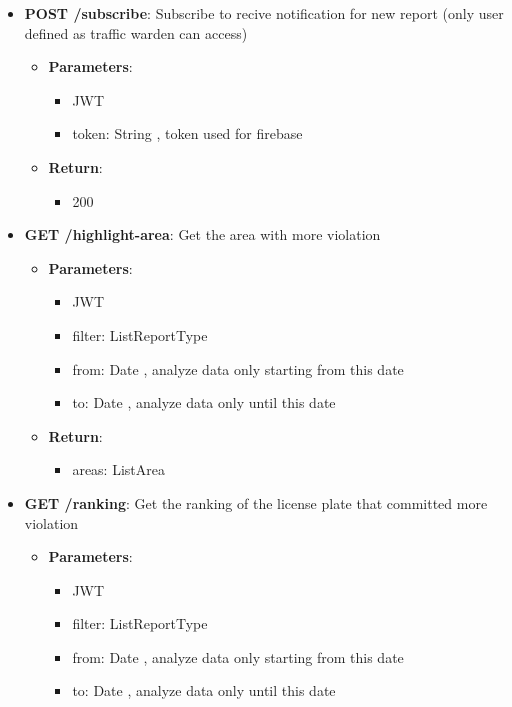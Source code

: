 \documentclass{article}
\begin{document}
\begin{itemize}
\begin{itemize}
			\item \textbf{POST /subscribe}:
				Subscribe to recive notification for new report (only user defined as traffic warden can access)
				\begin{itemize}
					\item \textbf{Parameters}:
						\begin{itemize}
							\item JWT
							\item token: String , token used for firebase
						\end{itemize}
					\item \textbf{Return}:
						\begin{itemize}
							\item 200
						\end{itemize}
				\end{itemize}
			\item \textbf{GET /highlight-area}:
				Get the area with more violation
				\begin{itemize}
					\item \textbf{Parameters}:
						\begin{itemize}
							\item JWT
							\item filter: List\textlangle{}ReportType\textrangle{}
							\item from: Date , analyze data only starting from this date
							\item to: Date , analyze data only until this date
						\end{itemize}
					\item \textbf{Return}:
						\begin{itemize}
							\item areas: List\textlangle{}Area\textrangle{}
						\end{itemize}
				\end{itemize}
			\item \textbf{GET /ranking}:
				Get the ranking of the license plate that committed more violation
				\begin{itemize}
					\item \textbf{Parameters}:
						\begin{itemize}
							\item JWT
							\item filter: List\textlangle{}ReportType\textrangle{}
							\item from: Date , analyze data only starting from this date
							\item to: Date , analyze data only until this date

\end{itemize}
\end{itemize}
\end{itemize}
\end{itemize}
\end{document}
